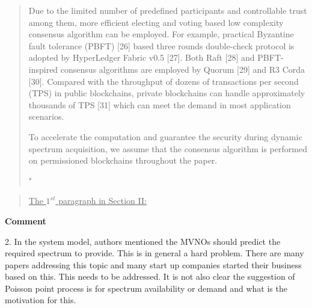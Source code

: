 \documentclass[12pt,draftcls, onecolumn]{IEEEtran}
\begin{document}
\begin{quote}
{{\hspace{0.15in} Due to the limited number of predefined participants and controllable trust among them, more efficient electing and voting based low complexity consensus algorithm can be employed. For example,  practical Byzantine fault tolerance (PBFT) [26] based three rounds double-check protocol is adopted by HyperLedger Fabric v0.5 [27]. Both Raft [28] and PBFT-inspired consensus algorithms are employed by Quorum [29] and R3 Corda [30]. Compared with the throughput of dozens of transactions per second (TPS) in public blockchains, private blockchains can handle approximately thousands of TPS [31] which can meet the demand in most application scenarios.

\hspace{0.15in} To accelerate the computation and guarantee the security during dynamic spectrum acquisition, we assume that the consensus algorithm is performed on permissioned blockchains throughout the paper.}"}
\end{quote}

\begin{quote}
\underline{The $1^{st}$ paragraph in Section II:}
\vspace{0mm}
\end{quote}

\vspace{3mm}
\noindent\textcolor[rgb]{1.00,0.00,0.00}{\textbf{Comment}}
\vspace{3mm}

2. In the system model, authors mentioned the MVNOs should predict the required spectrum to provide. This is in general a hard problem. There are many papers addressing this topic and many start up companies started their business based on this. This needs to be addressed. It is not also clear the suggestion of Poisson point process is for spectrum availability or demand and what is the motivation for this.
\end{document}
